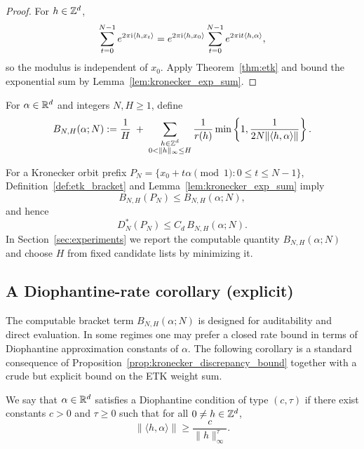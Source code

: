 \begin{proof}
For $h\in\mathbb{Z}^d$,
\[
\sum_{t=0}^{N-1} e^{2\pi \mathrm{i} \langle h,x_t\rangle}
=
e^{2\pi \mathrm{i} \langle h,x_0\rangle}
\sum_{t=0}^{N-1} e^{2\pi \mathrm{i} t\langle h,\alpha\rangle},
\]
so the modulus is independent of $x_0$. Apply Theorem~\ref{thm:etk} and bound the exponential sum by Lemma~\ref{lem:kronecker_exp_sum}.
\end{proof}

\begin{definition}
\label{def:kronecker_bracket}
For $\alpha\in\mathbb{R}^d$ and integers $N,H\ge 1$, define
\begin{equation}
\label{eq:kronecker_bracket_def}
B_{N,H}(\alpha;N)
:=
\frac{1}{H}
\;+\;
\sum_{\substack{h\in\mathbb{Z}^d\\0<\|h\|_\infty\le H}}
\frac{1}{r(h)}
\min\left\{1,\frac{1}{2N\|\langle h,\alpha\rangle\|}\right\}.
\end{equation}
\end{definition}

\begin{remark}
For a Kronecker orbit prefix $P_N=\{x_0+t\alpha\pmod{1}:0\le t\le N-1\}$, Definition~\ref{def:etk_bracket} and Lemma~\ref{lem:kronecker_exp_sum} imply
\[
B_{N,H}(P_N)\le B_{N,H}(\alpha;N),
\]
and hence
\begin{equation}
\label{eq:kronecker_certificate}
D_N^\ast(P_N)\le C_d\,B_{N,H}(\alpha;N).
\end{equation}
In Section~\ref{sec:experiments} we report the computable quantity $B_{N,H}(\alpha;N)$ and choose $H$ from fixed candidate lists by minimizing it.
\end{remark}

\subsection{A Diophantine-rate corollary (explicit)}
\label{app:diophantine_rate_corollary}

The computable bracket term $B_{N,H}(\alpha;N)$ is designed for auditability and direct evaluation. In some regimes one may prefer a closed rate bound in terms of Diophantine approximation constants of $\alpha$. The following corollary is a standard consequence of Proposition~\ref{prop:kronecker_discrepancy_bound} together with a crude but explicit bound on the ETK weight sum.

\begin{definition}
\label{def:diophantine_condition}
We say that $\alpha\in\mathbb{R}^d$ satisfies a Diophantine condition of type $(c,\tau)$ if there exist constants $c>0$ and $\tau\ge 0$ such that for all $0\neq h\in\mathbb{Z}^d$,
\begin{equation}
\label{eq:diophantine_condition}
\|\langle h,\alpha\rangle\|\ge \frac{c}{\|h\|_\infty^\tau}.
\end{equation}
\end{definition}

